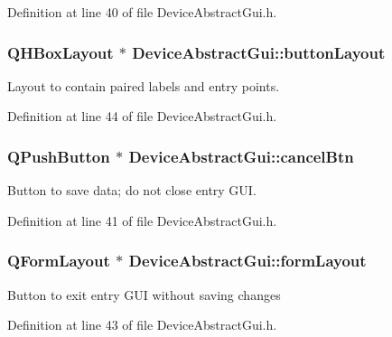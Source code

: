 Definition at line 40 of file Device\-Abstract\-Gui.\-h.

\hypertarget{class_device_abstract_gui_a8a5741b98bcb1af6e8396909e25bdc39}{
\subsubsection[{button\-Layout}]{\setlength{\rightskip}{0pt plus 5cm}Q\-H\-Box\-Layout $\ast$ Device\-Abstract\-Gui\-::button\-Layout\hspace{0.3cm}{\ttfamily [private]}}}\label{class_device_abstract_gui_a8a5741b98bcb1af6e8396909e25bdc39}
Layout to contain paired labels and entry points. 

Definition at line 44 of file Device\-Abstract\-Gui.\-h.

\hypertarget{class_device_abstract_gui_ad96194b28573843ebeb08830800a2d33}{
\subsubsection[{cancel\-Btn}]{\setlength{\rightskip}{0pt plus 5cm}Q\-Push\-Button $\ast$ Device\-Abstract\-Gui\-::cancel\-Btn\hspace{0.3cm}{\ttfamily [private]}}}\label{class_device_abstract_gui_ad96194b28573843ebeb08830800a2d33}
Button to save data; do not close entry G\-U\-I. 

Definition at line 41 of file Device\-Abstract\-Gui.\-h.

\hypertarget{class_device_abstract_gui_a7ec6dd51c843e538dee9288954ebde36}{
\subsubsection[{form\-Layout}]{\setlength{\rightskip}{0pt plus 5cm}Q\-Form\-Layout $\ast$ Device\-Abstract\-Gui\-::form\-Layout\hspace{0.3cm}{\ttfamily [private]}}}\label{class_device_abstract_gui_a7ec6dd51c843e538dee9288954ebde36}
Button to exit entry G\-U\-I without saving changes 

Definition at line 43 of file Device\-Abstract\-Gui.\-h.

